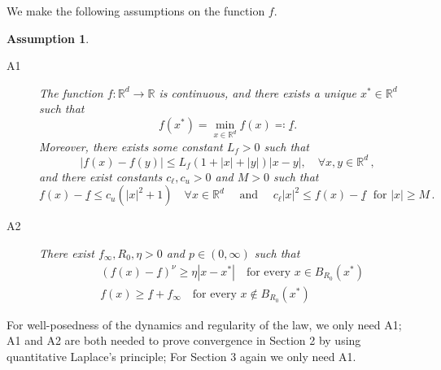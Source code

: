 \documentclass[reqno]{amsart}
\numberwithin{algorithm}{section}
\newcommand{\R}{\mathbb{R}}
\newcommand{\RR}{\mathbb{R}}
\newtheorem{assum}[theorem]{Assumption}
\begin{document}
{We make the following assumptions on the function $f$.
\begin{assum}\label{assumptions}
	\begin{description}
	    \item[A1] The function $f:\R^d\longrightarrow\R$ is continuous, and there exists a unique $x^*\in\R^d$ such that
        $$f(x^*) = \min_{x\in\R^d}f(x)\eqqcolon \underline f.$$
        Moreover,
        there exists some constant $L_{f}>0$ such that
		\begin{equation*}
			|f(x)-f(y)|\leq L_f(1+|x|+|y|)|x-y|, \quad \forall x,y\in \RR^d\,,
		\end{equation*}
		and there exist constants $c_\ell,c_u>0$  and $M>0$ such that
		\begin{equation*}
		 f(x)-\underline f\leq c_u(|x|^2+1)\quad \forall x\in \RR^d \quad \mbox{ and } \quad c_\ell|x|^2\leq f(x)-\underline f\; \mbox{ for }|x|\geq M\,.
		\end{equation*}
        \item[A2] There exist $f_{\infty},R_0,\eta>0$ and $p\in(0,\infty)$ such that
        \begin{equation*}
            \begin{aligned}
                &(f(x)-\underline f)^\nu\geq\eta |x-x^*| \quad \text{for every }x\in B_{R_0}(x^*)\\
                &f(x)\geq \underline f+f_{\infty}  \quad \text{for every }x\notin B_{R_0}(x^*)
            \end{aligned}
        \end{equation*}
	\end{description}
\end{assum}
For well-posedness of the dynamics and regularity of the law, we only need A1; A1 and A2 are both needed to prove convergence in Section 2 by using quantitative Laplace's principle; For Section 3 again we only need A1.

}
\end{document}
